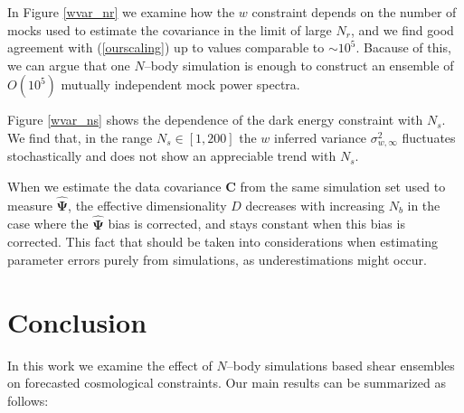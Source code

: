 \documentclass[reprint,aps,prd,superscriptaddress,showkeys,showpacs]{revtex4-1}
\newcommand{\bb}[1]{\mathbf{#1}}
\newcommand{\bbh}[1]{\mathbf{\hat{#1}}}
\begin{document}
In Figure \ref{wvar_nr} we examine how the $w$ constraint depends on the number of mocks used to estimate the covariance in the limit of large $N_r$, and we find good agreement with (\ref{ourscaling}) up to values comparable to $\sim 10^5$. Bacause of this, we can argue that one $N$--body simulation is enough to construct an ensemble of $O(10^5)$ mutually independent mock power spectra.    

Figure \ref{wvar_ns} shows the dependence of the dark energy constraint with $N_s$. We find that, in the range $N_s\in[1,200]$ the $w$ inferred variance $\sigma_{w,\infty}^2$ fluctuates stochastically and does not show an appreciable trend with $N_s$. 

When we estimate the data covariance $\bb{C}$ from the same simulation set used to measure $\bbh{\Psi}$, the effective dimensionality $D$ decreases with increasing $N_b$ in the case where the $\bbh{\Psi}$ bias is corrected, and stays constant when this bias is corrected. This fact that should be taken into considerations when estimating parameter errors purely from simulations, as underestimations might occur. 


\section{Conclusion}

In this work we examine the effect of $N$--body simulations based shear ensembles on forecasted cosmological constraints. Our main results can be summarized as follows:
\end{document}
